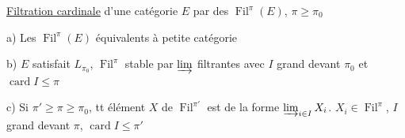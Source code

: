 \uline{Filtration cardinale} d'une catégorie $E$  par des $\operatorname{Fil}^{\pi}(E)$, $\pi\geq\pi_0$

a) Les $\operatorname{Fil}^{\pi}(E)$ équivalents à petite catégorie

b)  $E$ satisfait $L_{\pi_0}$, $\operatorname{Fil}^{\pi}$ stable par $\varinjlim$ filtrantes  avec $I$ grand devant $\pi_0$ et $\operatorname{card}I\leq\pi$

c) Si $\pi'\geq\pi\geq\pi_0$, tt élément $X$ de $\operatorname{Fil}^{\pi'}$ est de la forme $\varinjlim_{i\in I}X_i$. $X_i\in\operatorname{Fil}^\pi$, $I$ grand devant $\pi$, $\operatorname{card}I\leq\pi'$
